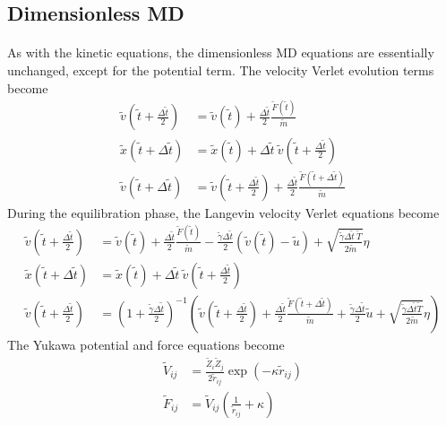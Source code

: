 \documentclass[11pt]{article}
\begin{document}
\subsection{Dimensionless MD}
\paragraph{}
As with the kinetic equations, the dimensionless MD equations are essentially unchanged, except for the potential term. The velocity Verlet evolution terms become
\begin{align*}
\tilde{v}(\tilde{t}+\frac{\Delta\tilde{t}}{2}) &= \tilde{v}(\tilde{t}) + \frac{\Delta\tilde{t}}{2}\frac{\tilde{F}(\tilde{t})}{\tilde{m}} \\
\tilde{x}(\tilde{t}+\Delta\tilde{t}) &= \tilde{x}(\tilde{t}) + \Delta\tilde{t}\:\tilde{v}(\tilde{t}+\frac{\Delta\tilde{t}}{2}) \\
\tilde{v}(\tilde{t}+\Delta\tilde{t}) &= \tilde{v}(\tilde{t}+\frac{\Delta\tilde{t}}{2}) + \frac{\Delta\tilde{t}}{2}\frac{\tilde{F}(\tilde{t}+\Delta\tilde{t})}{\tilde{m}}
\end{align*}
During the equilibration phase, the Langevin velocity Verlet equations become
\begin{align*}
\tilde{v}(\tilde{t}+\frac{\Delta\tilde{t}}{2}) &= \tilde{v}(\tilde{t}) + \frac{\Delta\tilde{t}}{2}\frac{\tilde{F}(\tilde{t})}{\tilde{m}} - \frac{\tilde{\gamma}\Delta\tilde{t}}{2}\left(\tilde{v}(\tilde{t})-\tilde{u}\right) + \sqrt{\frac{\tilde{\gamma}\Delta\tilde{t}\:\tilde{T}}{2\tilde{m}}}\eta \\
\tilde{x}(\tilde{t}+\Delta\tilde{t}) &= \tilde{x}(\tilde{t}) + \Delta\tilde{t}\:\tilde{v}(\tilde{t}+\frac{\Delta\tilde{t}}{2}) \\
\tilde{v}(\tilde{t}+\frac{\Delta\tilde{t}}{2}) &= \left(1+\frac{\tilde{\gamma}\Delta\tilde{t}}{2}\right)^{-1} \left(\tilde{v}(\tilde{t}+\frac{\Delta\tilde{t}}{2}) + \frac{\Delta\tilde{t}}{2}\frac{\tilde{F}(\tilde{t}+\Delta\tilde{t})}{\tilde{m}} + \frac{\tilde{\gamma}\Delta\tilde{t}}{2}\tilde{u} + \sqrt{\frac{\tilde{\gamma}\Delta\tilde{t}\tilde{T}}{2\tilde{m}}}\eta\right)
\end{align*}
The Yukawa potential and force equations become
\begin{align*}
\tilde{V}_{ij} &= \frac{\tilde{Z}_i\tilde{Z}_j}{2\tilde{r}_{ij}} \exp\left(-\kappa\tilde{r}_{ij}\right) \\
\tilde{F}_{ij} &= \tilde{V}_{ij} \left(\frac{1}{\tilde{r}_{ij}} + \kappa\right)
\end{align*}
\end{document}
